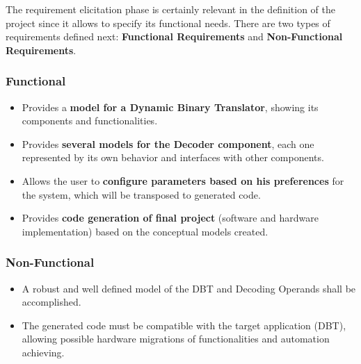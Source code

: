 The requirement elicitation phase is certainly relevant in the definition of the project since it allows to specify its functional needs. There are two types of requirements defined next: \textbf{Functional Requirements} and \textbf{Non-Functional Requirements}. 

\subsubsection{Functional}
\begin{itemize}
\item Provides a \textbf{model for a Dynamic Binary Translator}, showing its components and functionalities.
\item Provides \textbf{several models for the Decoder component}, each one represented by its own behavior and interfaces with other components. 
\item Allows the user to \textbf{configure parameters based on his preferences} for the system, which will be transposed to generated code.
\item Provides\textbf{ code generation of final project} (software and hardware implementation) based on the conceptual models created.
\end{itemize}

\subsubsection{Non-Functional}
\begin{itemize}
\item A robust and well defined model of the DBT and Decoding Operands shall be accomplished.
\item The generated code must be compatible with the target application (DBT), allowing possible hardware migrations of functionalities and automation achieving.
\end{itemize}

